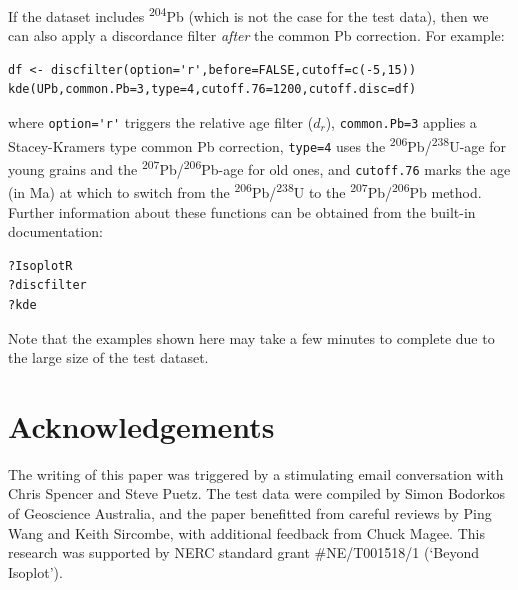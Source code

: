 \documentclass{article}
\begin{document}
\noindent If the dataset includes \textsuperscript{204}Pb (which is
not the case for the test data), then we can also apply a discordance
filter \textit{after} the common Pb correction. For example:

\begin{verbatim}
df <- discfilter(option='r',before=FALSE,cutoff=c(-5,15))
kde(UPb,common.Pb=3,type=4,cutoff.76=1200,cutoff.disc=df)
\end{verbatim}

\noindent where \verb|option='r'| triggers the relative age filter
($d_r$), \texttt{common.Pb=3} applies a Stacey-Kramers type common Pb
correction, \texttt{type=4} uses the
\textsuperscript{206}Pb/\textsuperscript{238}U-age for young grains
and the \textsuperscript{207}Pb/\textsuperscript{206}Pb-age for old
ones, and \texttt{cutoff.76} marks the age (in Ma) at which to switch
from the \textsuperscript{206}Pb/\textsuperscript{238}U to the
\textsuperscript{207}Pb/\textsuperscript{206}Pb method. Further
information about these functions can be obtained from the built-in
documentation:

\begin{verbatim}
?IsoplotR
?discfilter
?kde
\end{verbatim}

\noindent Note that the examples shown here may take a few minutes to
complete due to the large size of the test dataset.


\section*{Acknowledgements}
  The writing of this paper was triggered by a stimulating email
  conversation with Chris Spencer and Steve Puetz.  The test data were
  compiled by Simon Bodorkos of Geoscience Australia, and the paper
  benefitted from careful reviews by Ping Wang and Keith Sircombe,
  with additional feedback from Chuck Magee.  This research was
  supported by NERC standard grant \#NE/T001518/1 (`Beyond Isoplot').
\end{document}
